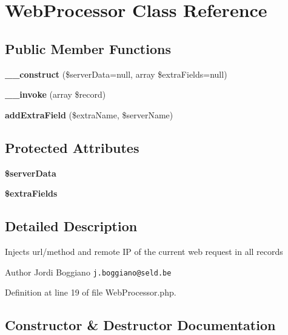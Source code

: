 \section{Web\+Processor Class Reference}
\label{class_monolog_1_1_processor_1_1_web_processor}
\subsection*{Public Member Functions}
\begin{DoxyCompactItemize}
\item 
{\bf \+\_\+\+\_\+construct} (\$server\+Data=null, array \$extra\+Fields=null)
\item 
{\bf \+\_\+\+\_\+invoke} (array \$record)
\item 
{\bf add\+Extra\+Field} (\$extra\+Name, \$server\+Name)
\end{DoxyCompactItemize}
\subsection*{Protected Attributes}
\begin{DoxyCompactItemize}
\item 
{\bf \$server\+Data}
\item 
{\bf \$extra\+Fields}
\end{DoxyCompactItemize}


\subsection{Detailed Description}
Injects url/method and remote I\+P of the current web request in all records

\begin{DoxyAuthor}{Author}
Jordi Boggiano {\tt j.\+boggiano@seld.\+be} 
\end{DoxyAuthor}


Definition at line 19 of file Web\+Processor.\+php.



\subsection{Constructor \& Destructor Documentation}
